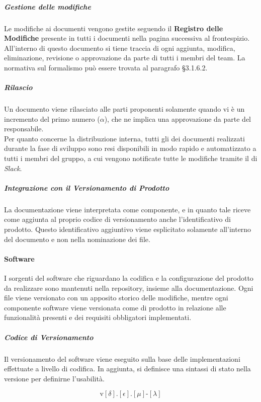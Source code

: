 		\subparagraph{Gestione delle modifiche}

		Le modifiche ai documenti vengono gestite seguendo il \textbf{Registro delle Modifiche} presente in tutti i documenti nella pagina successiva al frontespizio. All'interno di questo documento si tiene traccia di ogni aggiunta, modifica, eliminazione, revisione o approvazione da parte di tutti i membri del team. La normativa sul formalismo può essere trovata al paragrafo \S 3.1.6.2. %

		\subparagraph{Rilascio}

		Un documento viene rilasciato alle parti proponenti solamente quando vi è un incremento del primo numero (\(\alpha\)), che ne implica una approvazione da parte del responsabile. \\ 
		Per quanto concerne la distribuzione interna, tutti gli  dei documenti realizzati durante la fase di sviluppo sono resi disponibili in modo rapido e automatizzato a tutti i membri del gruppo, a cui vengono notificate tutte le modifiche tramite il  di \textit{Slack}.

		\subparagraph{Integrazione con il Versionamento di Prodotto}

		La documentazione viene interpretata come componente, e in quanto tale riceve come aggiunta al proprio codice di versionamento anche l'identificativo di prodotto. Questo identificativo aggiuntivo viene esplicitato solamente all'interno del documento e non nella nominazione dei file.

	\paragraph{Software}

	I sorgenti del software che riguardano la codifica e la configurazione del prodotto da realizzare sono mantenuti nella repository, insieme alla documentazione. Ogni file viene versionato con un apposito storico delle modifiche, mentre ogni componente software viene versionata come  di prodotto in relazione alle funzionalità presenti e dei requisiti obbligatori implementati. 


		\subparagraph{Codice di Versionamento}

		Il versionamento del software viene eseguito sulla base delle implementazioni effettuate a livello di codifica. 
		In aggiunta, si definisce una sintassi di stato nella versione per definirne l'usabilità.

		\[%
			\text{v}[\delta].[\epsilon].[\mu]\text{-}[\lambda]
		\]

